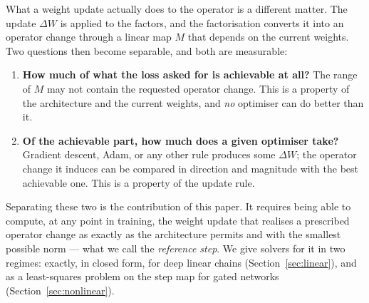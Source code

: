 \documentclass{article} %
\theoremstyle{plain}
\theoremstyle{definition}
\theoremstyle{remark}
\begin{document}
What a weight update actually does to the operator is a different matter. The update $\Delta W$ is
applied to the factors, and the factorisation converts it into an operator change through a linear
map $M$ that depends on the current weights. Two questions then become separable, and both are
measurable:

\begin{enumerate}[leftmargin=*,itemsep=2pt,topsep=3pt]
  \item \textbf{How much of what the loss asked for is achievable at all?} The range of $M$ may
        not contain the requested operator change. This is a property of the architecture and the
        current weights, and \emph{no} optimiser can do better than it.
  \item \textbf{Of the achievable part, how much does a given optimiser take?} Gradient descent,
        Adam, or any other rule produces some $\Delta W$; the operator change it induces can be
        compared in direction and magnitude with the best achievable one. This is a property of
        the update rule.
\end{enumerate}

Separating these two is the contribution of this paper. It requires being able to compute, at any
point in training, the weight update that realises a prescribed operator change as exactly as the
architecture permits and with the smallest possible norm --- what we call the \emph{reference
step}. We give solvers for it in two regimes: exactly, in closed form, for deep linear chains
(Section~\ref{sec:linear}), and as a least-squares problem on the step map for gated networks
(Section~\ref{sec:nonlinear}).
\end{document}
